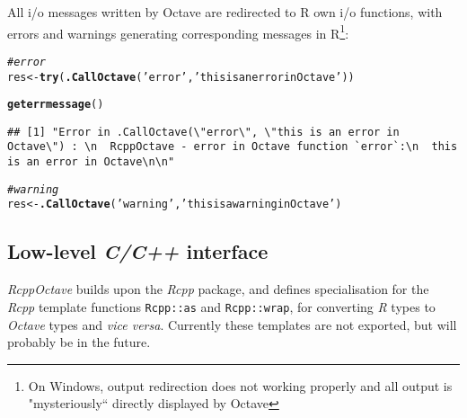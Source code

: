 \documentclass[english,10pt,a4paper]{article}\usepackage[]{graphicx}\usepackage[]{color}
\makeatletter
\newcommand{\hlstr}[1]{\textcolor[rgb]{0.192,0.494,0.8}{#1}}%
\newcommand{\hlcom}[1]{\textcolor[rgb]{0.678,0.584,0.686}{\textit{#1}}}%
\newcommand{\hlstd}[1]{\textcolor[rgb]{0.345,0.345,0.345}{#1}}%
\newcommand{\hlkwb}[1]{\textcolor[rgb]{0.69,0.353,0.396}{#1}}%
\newcommand{\hlkwd}[1]{\textcolor[rgb]{0.737,0.353,0.396}{\textbf{#1}}}%
\newenvironment{kframe}{%
 \def\at@end@of@kframe{}%
 \ifinner\ifhmode%
  \def\at@end@of@kframe{\end{minipage}}%
  \begin{minipage}{\columnwidth}%
 \fi\fi%
 \def\FrameCommand##1{\hskip\@totalleftmargin \hskip-\fboxsep
 \colorbox{shadecolor}{##1}\hskip-\fboxsep
     \hskip-\linewidth \hskip-\@totalleftmargin \hskip\columnwidth}%
 \MakeFramed {\advance\hsize-\width
   \@totalleftmargin\z@ \linewidth\hsize
   \@setminipage}}%
 {\par\unskip\endMakeFramed%
 \at@end@of@kframe}
\newenvironment{knitrout}{}{} %
\let\proglang=\textit
\let\code=\texttt
\newcommand{\pkgname}[1]{\textit{#1}\xspace}
\newcommand{\Rpkg}[1]{\pkgname{#1} package\xspace}
\newcommand{\octave}{\proglang{Octave}\xspace}
\makeatother
\begin{document}
All i/o messages written by Octave are redirected to R own i/o functions, with
errors and warnings generating corresponding messages in R\footnote{On
Windows, output redirection does not working properly and all output is
"mysteriously`` directly displayed by Octave}:
\begin{knitrout}
\color{fgcolor}\begin{kframe}
\begin{alltt}
\hlcom{# error}
\hlstd{res} \hlkwb{<-} \hlkwd{try}\hlstd{(}\hlkwd{.CallOctave}\hlstd{(}\hlstr{'error'}\hlstd{,} \hlstr{'this is an error in Octave'}\hlstd{))}
\end{alltt}


{\ttfamily\noindent\bfseries{}}\begin{alltt}
\hlkwd{geterrmessage}\hlstd{()}
\end{alltt}
\begin{verbatim}
## [1] "Error in .CallOctave(\"error\", \"this is an error in Octave\") : \n  RcppOctave - error in Octave function `error`:\n  this is an error in Octave\n\n"
\end{verbatim}
\begin{alltt}
\hlcom{# warning}
\hlstd{res} \hlkwb{<-} \hlkwd{.CallOctave}\hlstd{(}\hlstr{'warning'}\hlstd{,} \hlstr{'this is a warning in Octave'}\hlstd{)}
\end{alltt}


{\ttfamily\noindent{}}\end{kframe}
\end{knitrout}


\subsection{Low-level \textit{C/C++} interface}

\pkgname{RcppOctave} builds upon the \Rpkg{Rcpp}, and defines specialisation
for the \proglang{Rcpp} template functions \code{Rcpp::as} and
\code{Rcpp::wrap}, for converting \proglang{R} types to \octave
types and \emph{vice versa}.
Currently these templates are not exported, but will probably be in the future.
\end{document}
